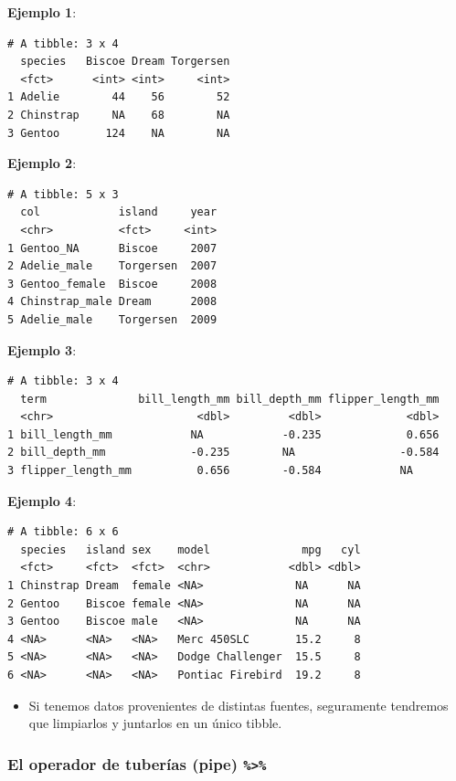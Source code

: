 \documentclass[
  letterpaper,
  DIV=11,
  numbers=noendperiod]{scrreprt}
\providecommand{\tightlist}{%
  \setlength{\itemsep}{0pt}\setlength{\parskip}{0pt}}\usepackage{longtable,booktabs,array}
\begin{document}
\textbf{Ejemplo 1}:

\begin{verbatim}
# A tibble: 3 x 4
  species   Biscoe Dream Torgersen
  <fct>      <int> <int>     <int>
1 Adelie        44    56        52
2 Chinstrap     NA    68        NA
3 Gentoo       124    NA        NA
\end{verbatim}

\textbf{Ejemplo 2}:

\begin{verbatim}
# A tibble: 5 x 3
  col            island     year
  <chr>          <fct>     <int>
1 Gentoo_NA      Biscoe     2007
2 Adelie_male    Torgersen  2007
3 Gentoo_female  Biscoe     2008
4 Chinstrap_male Dream      2008
5 Adelie_male    Torgersen  2009
\end{verbatim}

\textbf{Ejemplo 3}:

\begin{verbatim}
# A tibble: 3 x 4
  term              bill_length_mm bill_depth_mm flipper_length_mm
  <chr>                      <dbl>         <dbl>             <dbl>
1 bill_length_mm            NA            -0.235             0.656
2 bill_depth_mm             -0.235        NA                -0.584
3 flipper_length_mm          0.656        -0.584            NA    
\end{verbatim}

\textbf{Ejemplo 4}:

\begin{verbatim}
# A tibble: 6 x 6
  species   island sex    model              mpg   cyl
  <fct>     <fct>  <fct>  <chr>            <dbl> <dbl>
1 Chinstrap Dream  female <NA>              NA      NA
2 Gentoo    Biscoe female <NA>              NA      NA
3 Gentoo    Biscoe male   <NA>              NA      NA
4 <NA>      <NA>   <NA>   Merc 450SLC       15.2     8
5 <NA>      <NA>   <NA>   Dodge Challenger  15.5     8
6 <NA>      <NA>   <NA>   Pontiac Firebird  19.2     8
\end{verbatim}

\begin{itemize}
\tightlist
\item
  Si tenemos datos provenientes de distintas fuentes, seguramente
  tendremos que limpiarlos y juntarlos en un único tibble.
\end{itemize}

\hypertarget{el-operador-de-tuberuxedas-pipe}{%
\subsubsection{\texorpdfstring{El operador de tuberías (pipe)
\texttt{\%\textgreater{}\%}}{El operador de tuberías (pipe) \%\textgreater\%}}\label{el-operador-de-tuberuxedas-pipe}}
\end{document}
